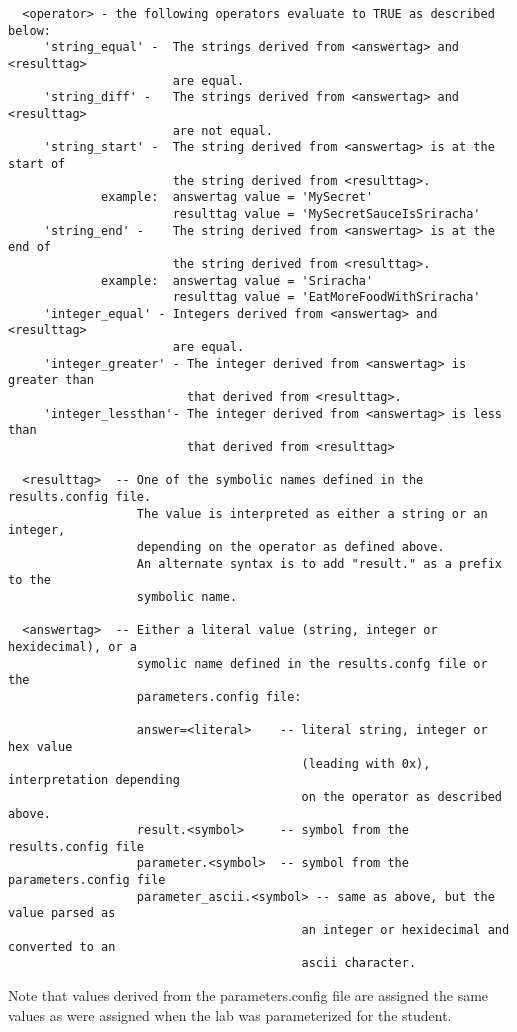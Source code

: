 \documentclass{article}
\begin{document}
\begin{verbatim}
  <operator> - the following operators evaluate to TRUE as described below:
     'string_equal' -  The strings derived from <answertag> and <resulttag>
                       are equal.
     'string_diff' -   The strings derived from <answertag> and <resulttag>
                       are not equal.
     'string_start' -  The string derived from <answertag> is at the start of 
                       the string derived from <resulttag>.
             example:  answertag value = 'MySecret'
                       resulttag value = 'MySecretSauceIsSriracha'
     'string_end' -    The string derived from <answertag> is at the end of
                       the string derived from <resulttag>.
             example:  answertag value = 'Sriracha'
                       resulttag value = 'EatMoreFoodWithSriracha'
     'integer_equal' - Integers derived from <answertag> and <resulttag>
                       are equal.
     'integer_greater' - The integer derived from <answertag> is greater than
                         that derived from <resulttag>.
     'integer_lessthan'- The integer derived from <answertag> is less than
                         that derived from <resulttag>
               
  <resulttag>  -- One of the symbolic names defined in the results.config file.
                  The value is interpreted as either a string or an integer,
                  depending on the operator as defined above. 
                  An alternate syntax is to add "result." as a prefix to the
                  symbolic name.
         
  <answertag>  -- Either a literal value (string, integer or hexidecimal), or a 
                  symolic name defined in the results.confg file or the 
                  parameters.config file:
 
                  answer=<literal>    -- literal string, integer or hex value 
                                         (leading with 0x), interpretation depending 
                                         on the operator as described above.
                  result.<symbol>     -- symbol from the results.config file
                  parameter.<symbol>  -- symbol from the parameters.config file
                  parameter_ascii.<symbol> -- same as above, but the value parsed as 
                                         an integer or hexidecimal and converted to an 
                                         ascii character.

\end{verbatim}
         Note that values derived from the parameters.config file are assigned the same values as
         were assigned when the lab was parameterized for the student.
\end{document}
